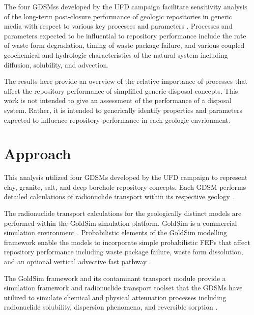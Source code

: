 
The four \glspl{GDSM}s developed by the \gls{UFD} campaign facilitate sensitivity 
analysis of the long-term post-closure performance of geologic repositories in 
generic media with respect to various key processes and parameters 
\cite{clayton_generic_2011}. Processes and parameters expected to be influential to repository 
performance  include the rate of waste form degradation, timing of waste package 
failure, and various coupled geochemical and hydrologic characteristics of the 
natural system including diffusion, solubility, and advection.

The results here provide an overview of the relative importance of processes 
that affect the repository performance of simplified generic disposal 
concepts. This work is not intended to give an assessment of the performance of a 
disposal system. Rather, it is intended to  
generically identify properties and parameters expected to influence repository 
performance in each geologic envrionment.


\section{Approach}

This analysis utilized four \gls{GDSM}s developed by the \gls{UFD} campaign to 
represent clay, granite, salt, and deep borehole repository concepts. Each 
\gls{GDSM} performs detailed calculations of radionuclide transport within its 
respective geology \cite{clayton_generic_2011}.

The radionuclide transport calculations for the geologically distinct models 
are performed within the GoldSim simulation platform. GoldSim is a commercial 
simulation environment \cite{golder_goldsim_2010, golder_goldsim_ct_2010}.
Probabilistic elements of the GoldSim modelling framework enable the models to 
incorporate simple probabilistic \gls{FEPs} that affect repository performance 
including waste package failure, waste form dissolution, and an optional 
vertical advective fast pathway \cite{clayton_generic_2011}. 

The GoldSim framework and 
its contaminant transport module provide a simulation framework and 
radionuclide transport toolset that the \glspl{GDSM} have utilized to 
simulate chemical and physical attenuation processes including radionuclide 
solubility, dispersion phenomena, and reversible sorption 
\cite{golder_goldsim_2010, golder_goldsim_ct_2010}. 


